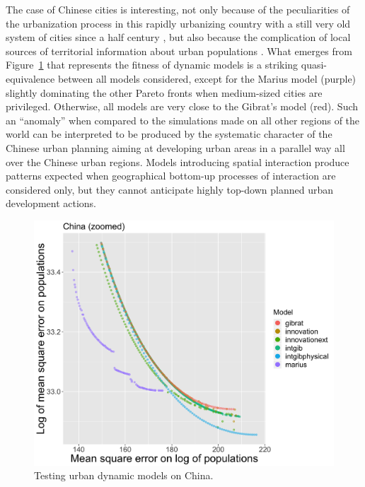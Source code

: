 \documentclass[11pt]{article}
\begin{document}
The case of Chinese cities is interesting, not only because of the peculiarities of the urbanization process in this rapidly urbanizing country with a still very old system of cities since a half century \cite{wu2020emerging}, but also because the complication of local sources of territorial information about urban populations \cite{swerts2013systemes,swerts2017data}. What emerges from Figure~\ref{fig:fig8} that represents the fitness of dynamic models is a striking quasi-equivalence between all models considered, except for the Marius model (purple) slightly dominating the other Pareto fronts when medium-sized cities are privileged. Otherwise, all models are very close to the Gibrat's model (red). Such an ``anomaly'' when compared to the simulations made on all other regions of the world can be interpreted to be produced by the systematic character of the Chinese urban planning aiming at developing urban areas in a parallel way all over the Chinese urban regions. Models introducing spatial interaction produce patterns expected when geographical bottom-up processes of interaction are considered only, but they cannot anticipate highly top-down planned urban development actions.

\begin{figure}
\centering
\includegraphics[width=\textwidth]{Fig8.png}
\caption{Testing urban dynamic models on China.\label{fig:fig8}}
\end{figure}   
\end{document}
